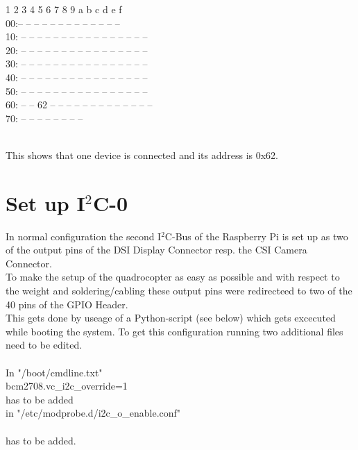\ttfamily
 \quad{}  1  2  3  4  5  6  7  8  9  a  b  c  d  e  f \\
00:\qquad\quad\quad-- -- -- -- -- -- -- -- -- -- -- -- -- \\
10: -- -- -- -- -- -- -- -- -- -- -- -- -- -- -- -- \\
20: -- -- -- -- -- -- -- -- -- -- -- -- -- -- -- -- \\
30: -- -- -- -- -- -- -- -- -- -- -- -- -- -- -- -- \\
40: -- -- -- -- -- -- -- -- -- -- -- -- -- -- -- -- \\
50: -- -- -- -- -- -- -- -- -- -- -- -- -- -- -- -- \\
60: -- -- 62 -- -- -- -- -- -- -- -- -- -- -- -- -- \\
70: -- -- -- -- -- -- -- -- \\\\
\normalfont

This shows that one device is connected and its address is 0x62.\\ 


\newpage

\section{Set up I$^2$C-0}
\label{sec:setupi2c0}


In normal configuration the second I$^2$C-Bus of the Raspberry Pi is set up as two of the output pins of the DSI Display Connector resp. the CSI Camera Connector.\\
To make the setup of the quadrocopter as easy as possible and with respect to the weight and soldering/cabling these output pins were redirecteed to two of the 40 pins of the GPIO Header.\\

This gets done by useage of a Python-script (see below) which gets excecuted while booting the system. To get this configuration running two additional files need to be edited.\\\\
In "/boot/cmdline.txt"\\
\ttfamily bcm2708.vc\_i2c\_override=1 \\
\normalfont has to be added\\
in "/etc/modprobe.d/i2c\_o\_enable.conf"\\
 \\
\normalfont has to be added.\\

